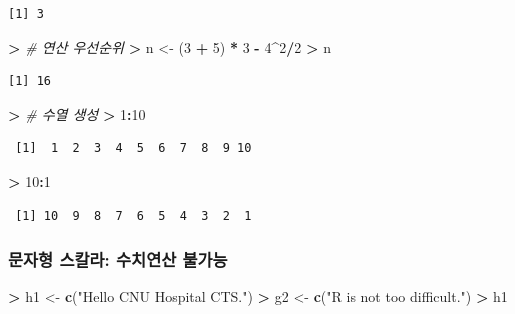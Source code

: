 \documentclass[11pt,a4paper]{book}
\newenvironment{Shaded}{\begin{snugshade}}{\end{snugshade}}
\newcommand{\KeywordTok}[1]{\textcolor[rgb]{0.13,0.29,0.53}{\textbf{#1}}}
\newcommand{\DecValTok}[1]{\textcolor[rgb]{0.00,0.00,0.81}{#1}}
\newcommand{\StringTok}[1]{\textcolor[rgb]{0.31,0.60,0.02}{#1}}
\newcommand{\CommentTok}[1]{\textcolor[rgb]{0.56,0.35,0.01}{\textit{#1}}}
\newcommand{\OperatorTok}[1]{\textcolor[rgb]{0.81,0.36,0.00}{\textbf{#1}}}
\newcommand{\ErrorTok}[1]{\textcolor[rgb]{0.64,0.00,0.00}{\textbf{#1}}}
\newcommand{\NormalTok}[1]{#1}
\theoremstyle{definition}
\theoremstyle{definition}
\theoremstyle{definition}
\theoremstyle{remark}
\begin{document}
\begin{verbatim}
[1] 3
\end{verbatim}

\begin{Shaded}
\begin{Highlighting}[]
\OperatorTok{>}\StringTok{ }\CommentTok{# 연산 우선순위}
\ErrorTok{>}\StringTok{ }\NormalTok{n <-}\StringTok{ }\NormalTok{(}\DecValTok{3} \OperatorTok{+}\StringTok{ }\DecValTok{5}\NormalTok{) }\OperatorTok{*}\StringTok{ }\DecValTok{3} \OperatorTok{-}\StringTok{ }\DecValTok{4}\OperatorTok{^}\DecValTok{2}\OperatorTok{/}\DecValTok{2}
\OperatorTok{>}\StringTok{ }\NormalTok{n}
\end{Highlighting}
\end{Shaded}

\begin{verbatim}
[1] 16
\end{verbatim}

\begin{Shaded}
\begin{Highlighting}[]
\OperatorTok{>}\StringTok{ }\CommentTok{# 수열 생성}
\ErrorTok{>}\StringTok{ }\DecValTok{1}\OperatorTok{:}\DecValTok{10}
\end{Highlighting}
\end{Shaded}

\begin{verbatim}
 [1]  1  2  3  4  5  6  7  8  9 10
\end{verbatim}

\begin{Shaded}
\begin{Highlighting}[]
\OperatorTok{>}\StringTok{ }\DecValTok{10}\OperatorTok{:}\DecValTok{1}
\end{Highlighting}
\end{Shaded}

\begin{verbatim}
 [1] 10  9  8  7  6  5  4  3  2  1
\end{verbatim}

\normalsize

\subsubsection{문자형 스칼라: 수치연산 불가능}\label{---}

\footnotesize

\begin{Shaded}
\begin{Highlighting}[]
\OperatorTok{>}\StringTok{ }\NormalTok{h1 <-}\StringTok{ }\KeywordTok{c}\NormalTok{(}\StringTok{"Hello CNU Hospital CTS."}\NormalTok{)}
\OperatorTok{>}\StringTok{ }\NormalTok{g2 <-}\StringTok{ }\KeywordTok{c}\NormalTok{(}\StringTok{"R is not too difficult."}\NormalTok{)}
\OperatorTok{>}\StringTok{ }\NormalTok{h1}
\end{Highlighting}
\end{Shaded}
\end{document}
